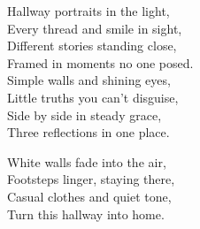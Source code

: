 \begin{lyrics}
Hallway portraits in the light,\\
Every thread and smile in sight,\\
Different stories standing close,\\
Framed in moments no one posed.\\
Simple walls and shining eyes,\\
Little truths you can't disguise,\\
Side by side in steady grace,\\
Three reflections in one place.

White walls fade into the air,\\
Footsteps linger, staying there,\\
Casual clothes and quiet tone,\\
Turn this hallway into home.
\end{lyrics}

